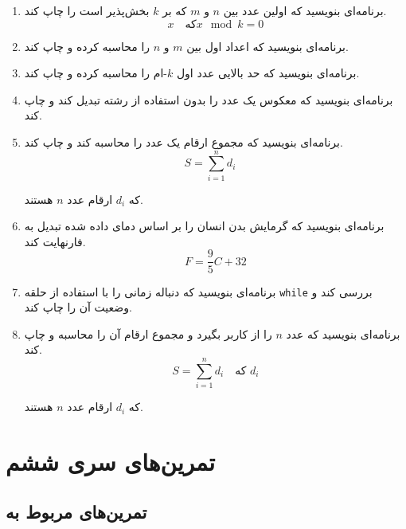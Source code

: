 \documentclass[b5paper,12pt]{article}
\begin{document}
\begin{enumerate}
		\item برنامه‌ای بنویسید که اولین عدد بین \(n\) و \(m\) که بر \(k\) بخش‌پذیر است را چاپ کند.
		\[
		x \quad \text{که} x \mod k = 0
		\]
		
		\item برنامه‌ای بنویسید که اعداد اول بین \(m\) و \(n\) را محاسبه کرده و چاپ کند.
		
		\item برنامه‌ای بنویسید که حد بالایی عدد اول \(k\)-ام را محاسبه کرده و چاپ کند.
		
		\item برنامه‌ای بنویسید که معکوس یک عدد را بدون استفاده از رشته تبدیل کند و چاپ کند.
		
		\item برنامه‌ای بنویسید که مجموع ارقام یک عدد را محاسبه کند و چاپ کند.
		\[
		S = \sum_{i=1}^{n} d_i \quad
		\]
		
		
		\begin{center}
			که \( d_i \) ارقام عدد \( n \) هستند.
		\end{center}
		
		
		\item برنامه‌ای بنویسید که گرمایش بدن انسان را بر اساس دمای داده شده تبدیل به فارنهایت کند.
		\[
		F = \frac{9}{5}C + 32
		\]
		
		\item برنامه‌ای بنویسید که دنباله زمانی را با استفاده از حلقه \texttt{while} بررسی کند و وضعیت آن را چاپ کند.
		
		\item 	برنامه‌ای بنویسید که عدد \(n\) را از کاربر بگیرد و مجموع ارقام آن را محاسبه و چاپ کند.
		\[
		S = \sum_{i=1}^{n} d_i \quad \text{که } d_i
		\]
		
		\begin{center}
			که \( d_i \) ارقام عدد \( n \) هستند.
		\end{center}
		
		
	\end{enumerate}
	
	
	
	\newpage
	\section*{تمرین‌های سری ششم}
	
	\subsection*{تمرین‌های مربوط به }
	
\end{document}
